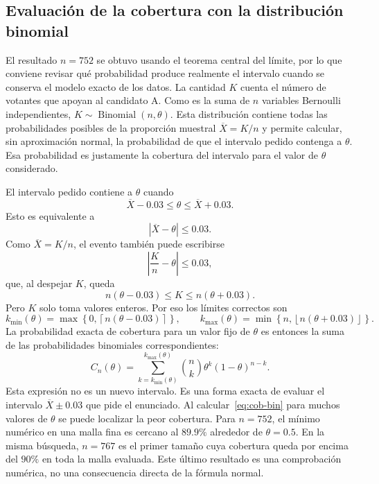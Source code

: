 \documentclass[10pt,a4paper,oneside]{article}
\begin{document}
\subsection*{Evaluación de la cobertura con la distribución binomial}

El resultado $n=752$ se obtuvo usando el teorema central del límite, por lo que conviene revisar qué probabilidad produce realmente el intervalo cuando se conserva el modelo exacto de los datos. La cantidad $K$ cuenta el número de votantes que apoyan al candidato A. Como es la suma de $n$ variables Bernoulli independientes, $K\sim\operatorname{Binomial}(n,\theta)$. Esta distribución contiene todas las probabilidades posibles de la proporción muestral $\overline X=K/n$ y permite calcular, sin aproximación normal, la probabilidad de que el intervalo pedido contenga a $\theta$. Esa probabilidad es justamente la cobertura del intervalo para el valor de $\theta$ considerado.

El intervalo pedido contiene a $\theta$ cuando
\begin{equation*}
\overline X-0.03\leq\theta\leq\overline X+0.03.
\end{equation*}
Esto es equivalente a
\begin{equation*}
|\overline X-\theta|\leq0.03.
\end{equation*}
Como $\overline X=K/n$, el evento también puede escribirse
\begin{equation*}
\left|\frac{K}{n}-\theta\right|\leq0.03,
\end{equation*}
que, al despejar $K$, queda
\begin{equation*}
n(\theta-0.03)\leq K\leq n(\theta+0.03).
\end{equation*}
Pero $K$ solo toma valores enteros. Por eso los límites correctos son
\begin{equation*}
k_{\min}(\theta)=\max\!\left\{0,\left\lceil n(\theta-0.03)\right\rceil\right\},
\qquad
k_{\max}(\theta)=\min\!\left\{n,\left\lfloor n(\theta+0.03)\right\rfloor\right\}.
\end{equation*}
La probabilidad exacta de cobertura para un valor fijo de $\theta$ es entonces la suma de las probabilidades binomiales correspondientes:
\begin{equation}
C_n(\theta)=
\sum_{k=k_{\min}(\theta)}^{k_{\max}(\theta)}
\binom{n}{k}\theta^k(1-\theta)^{n-k}.
\label{eq:cob-bin}
\end{equation}
Esta expresión no es un nuevo intervalo. Es una forma exacta de evaluar el intervalo $\overline X\pm0.03$ que pide el enunciado. Al calcular~\eqref{eq:cob-bin} para muchos valores de $\theta$ se puede localizar la peor cobertura. Para $n=752$, el mínimo numérico en una malla fina es cercano al $89.9\%$ alrededor de $\theta=0.5$. En la misma búsqueda, $n=767$ es el primer tamaño cuya cobertura queda por encima del $90\%$ en toda la malla evaluada. Este último resultado es una comprobación numérica, no una consecuencia directa de la fórmula normal.
\end{document}

